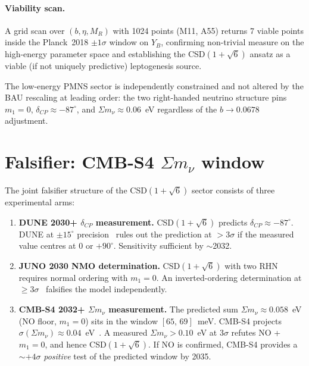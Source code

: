\documentclass[aps,prl,twocolumn,showpacs,superscriptaddress]{revtex4-2}
\begin{document}
\paragraph{Viability scan.}
A grid scan over $(b, \eta, M_R)$ with 1024 points (M11, A55)
returns 7 viable points inside the Planck~2018 $\pm 1\sigma$
window on $Y_B$, confirming non-trivial measure on the
high-energy parameter space and establishing the CSD$(1+\sqrt{6})$
ansatz as a viable (if not uniquely predictive) leptogenesis source.

The low-energy PMNS sector is independently constrained and
not altered by the BAU rescaling at leading order: the two
right-handed neutrino structure pins $m_1 = 0$,
$\delta_{CP} \approx -87^{\circ}$, and $\Sigma m_\nu \approx 0.06$~eV
regardless of the $b\to 0.0678$ adjustment.

\section{Falsifier: CMB-S4 $\Sigma m_\nu$ window}
\label{sec:falsifier}

The joint falsifier structure of the CSD$(1+\sqrt{6})$ sector
consists of three experimental arms:

\begin{enumerate}
\item \textbf{DUNE 2030+ $\delta_{CP}$ measurement.}
  CSD$(1+\sqrt{6})$ predicts $\delta_{CP} \approx -87^{\circ}$.
  DUNE at $\pm 15^{\circ}$ precision~\cite{DUNE24} rules out
  the prediction at $> 3\sigma$ if the measured value centres at
  $0$ or $+90^{\circ}$.  Sensitivity sufficient by $\sim$2032.

\item \textbf{JUNO 2030 NMO determination.}
  CSD$(1+\sqrt{6})$ with two RHN requires normal ordering with
  $m_1 = 0$.  An inverted-ordering determination at
  $\geq 3\sigma$~\cite{JUNO22} falsifies the model independently.

\item \textbf{CMB-S4 2032+ $\Sigma m_\nu$ measurement.}
  The predicted sum $\Sigma m_\nu \approx 0.058$~eV (NO floor,
  $m_1=0$) sits in the window $[65,\,69]$~meV.  CMB-S4
  projects $\sigma(\Sigma m_\nu) \approx 0.04$~eV~\cite{CMBS4}.
  A measured $\Sigma m_\nu > 0.10$~eV at $3\sigma$ refutes NO
  + $m_1 = 0$, and hence CSD$(1+\sqrt{6})$.  If NO is confirmed,
  CMB-S4 provides a $\sim +4\sigma$ \emph{positive} test of the
  predicted window by 2035.
\end{enumerate}
\end{document}
